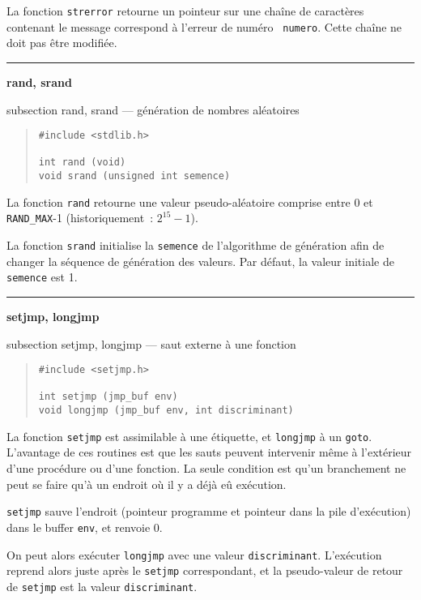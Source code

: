 \documentclass [twoside] {report}
\newcommand {\primitive} [1]
    {
	\phantomsection
	{\large \bf #1}
	\addcontentsline {toc} {subsection} {#1}
    }
\newcommand {\separation}
    {
	\vspace {5mm}
	\nopagebreak
	\hrule
    }
\begin{document}
La fonction {\tt strerror} retourne un pointeur sur une chaîne de
caractères contenant le message correspond à l'erreur de numéro {\tt
numero}. Cette chaîne ne doit pas être modifiée.



\separation 
\primitive {rand, srand} --- génération de nombres aléatoires

\begin {quote}
\begin {verbatim}
#include <stdlib.h>

int rand (void)
void srand (unsigned int semence)
\end{verbatim}
\end {quote}

La fonction {\tt rand} retourne une valeur pseudo-aléatoire comprise
entre 0 et \texttt {RAND\_MAX}-1 (historiquement~: $2^{15}-1$).

La fonction {\tt srand} initialise la {\tt semence} de l'algorithme de
génération afin de changer la séquence de génération des valeurs.
Par défaut, la valeur initiale de {\tt semence} est 1.




\separation 
\primitive {setjmp, longjmp} --- saut externe à une fonction

\begin {quote}
\begin {verbatim}
#include <setjmp.h>

int setjmp (jmp_buf env)
void longjmp (jmp_buf env, int discriminant)
\end{verbatim}
\end {quote}

La fonction {\tt setjmp} est assimilable à une étiquette, et
{\tt longjmp} à un {\tt goto}. L'avantage de ces routines est que
les sauts peuvent intervenir même à l'extérieur d'une
procédure ou d'une fonction. La seule condition est qu'un
branchement ne peut se faire qu'à un endroit où il y a déjà
eû exécution.

{\tt setjmp} sauve l'endroit (pointeur programme et pointeur
dans la pile d'exécution) dans le buffer {\tt env}, et renvoie
0.

On peut alors exécuter {\tt longjmp} avec une valeur
{\tt discriminant}. L'exécution reprend alors juste après le
{\tt setjmp} correspondant, et la pseudo-valeur de retour de
{\tt setjmp} est la valeur {\tt discriminant}.
\end{document}
